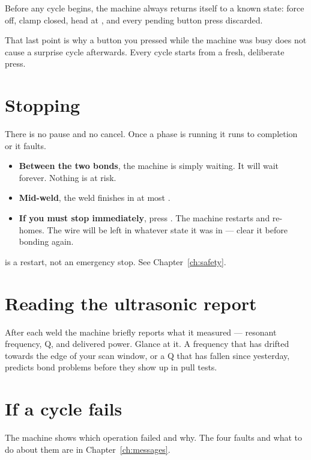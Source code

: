Before any cycle begins, the machine always returns itself to a known state:
force off, clamp closed, head at , and every pending
button press discarded.

\begin{wbnote}
That last point is why a button you pressed while the machine was busy does not
cause a surprise cycle afterwards. Every cycle starts from a fresh, deliberate
press.
\end{wbnote}

\section{Stopping}

There is no pause and no cancel. Once a phase is running it runs to completion
or it faults.

\begin{itemize}[leftmargin=*]
\item \textbf{Between the two bonds}, the machine is simply waiting. It will
  wait forever. Nothing is at risk.
\item \textbf{Mid-weld}, the weld finishes in at most .
\item \textbf{If you must stop immediately}, press . The machine
  restarts and re-homes. The wire will be left in whatever state it was in ---
  clear it before bonding again.
\end{itemize}

\begin{wbwarning}
 is a restart, not an emergency stop. See Chapter~\ref{ch:safety}.
\end{wbwarning}

\section{Reading the ultrasonic report}

After each weld the machine briefly reports what it measured --- resonant
frequency, Q, and delivered power. Glance at it. A frequency that has drifted
towards the edge of your scan window, or a Q that has fallen since yesterday,
predicts bond problems before they show up in pull tests.

\section{If a cycle fails}

The machine shows which operation failed and why. The four faults and what to
do about them are in Chapter~\ref{ch:messages}.

